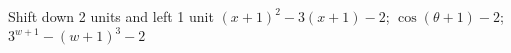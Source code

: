 {Shift down 2 units and left 1 unit}
{$(x+1)^2-3(x+1) -2$; $\cos{(\theta+1)} -2$; $3^{w+1} - (w+1)^3 -2$}
